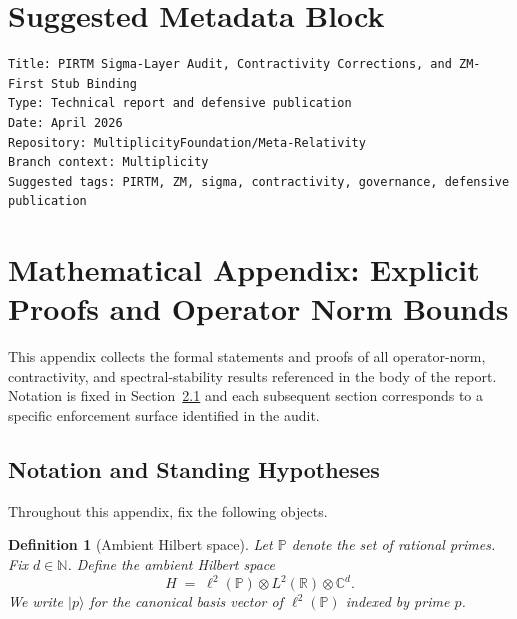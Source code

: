 \documentclass[11pt]{article}
\begin{document}
\section{Suggested Metadata Block}

\begin{verbatim}
Title: PIRTM Sigma-Layer Audit, Contractivity Corrections, and ZM-First Stub Binding
Type: Technical report and defensive publication
Date: April 2026
Repository: MultiplicityFoundation/Meta-Relativity
Branch context: Multiplicity
Suggested tags: PIRTM, ZM, sigma, contractivity, governance, defensive publication
\end{verbatim}


\appendix
\renewcommand{\thesection}{\Alph{section}}
\setcounter{section}{0}

\newtheorem{theorem}{Theorem}[section]
\newtheorem{lemma}[theorem]{Lemma}
\newtheorem{proposition}[theorem]{Proposition}
\newtheorem{corollary}[theorem]{Corollary}
\newtheorem{definition}[theorem]{Definition}
\newtheorem{remark}[theorem]{Remark}

\section{Mathematical Appendix: Explicit Proofs and Operator Norm Bounds}

This appendix collects the formal statements and proofs of all
operator-norm, contractivity, and spectral-stability results
referenced in the body of the report.
Notation is fixed in Section~\ref{sec:notation}
and each subsequent section corresponds to a specific
enforcement surface identified in the audit.

\subsection{Notation and Standing Hypotheses}
\label{sec:notation}

Throughout this appendix, fix the following objects.

\begin{definition}[Ambient Hilbert space]
Let $\mathbb{P}$ denote the set of rational primes.
Fix $d\in\mathbb{N}$.
Define the \emph{ambient Hilbert space}
\[
H \;=\; \ell^{2}(\mathbb{P})\otimes L^{2}(\mathbb{R})\otimes\mathbb{C}^{d}.
\]
We write $|p\rangle$ for the canonical basis vector of
$\ell^{2}(\mathbb{P})$ indexed by prime $p$.
\end{definition}
\end{document}
